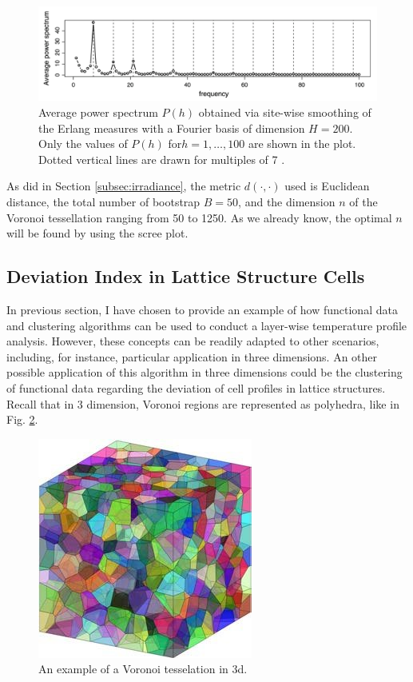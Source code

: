\begin{figure}[H]
    \centering
    \includegraphics[scale=0.6]{Images/fantasmino.png}
    \caption[Spectrum of Erlang data.]{Average power spectrum $P(h)$ obtained via site-wise smoothing of the Erlang measures with a Fourier basis of dimension $H = 200$. Only the values of $P(h)$ for$ h = 1, \dots, 100$ are shown in the plot. Dotted vertical lines are drawn for multiples of 7 \cite{secchi_analysis_2015}.}
    \label{fig:fantasmino}
\end{figure}

As did in Section \ref{subsec:irradiance}, the metric $d(\cdot, \cdot)$ used is Euclidean distance, the total number of bootstrap $B=50$, and the dimension $n$ of the Voronoi tessellation ranging from 50 to 1250. As we already know, the optimal $n$ will be found by using the scree plot.


\subsection{Deviation Index in Lattice Structure Cells}
\label{subsec:devcell}
In previous section, I have chosen to provide an example of how functional data and clustering algorithms can be used to conduct a layer-wise temperature profile analysis. However, these concepts can be readily adapted to other scenarios, including, for instance, particular application in three dimensions. An other possible application of this algorithm in three dimensions could be the clustering of functional data regarding the deviation of cell profiles in lattice structures. Recall that in 3 dimension, Voronoi regions are represented as polyhedra, like in Fig. \ref{fig:3dvoronoi}.

\begin{figure}[H]
    \centering
    \includegraphics[scale=0.43]{Images/3D-Voronoi-tessellation-with-1000-grains-unit-cell-with-its-internal-grains-not.png}
    \caption[3d Voronoi tessellation.]{An example of a Voronoi tesselation in 3d.}
    \label{fig:3dvoronoi}
\end{figure}

